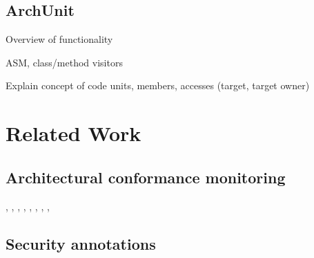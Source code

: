 \subsection{ArchUnit}\label{archunit-back-section}

Overview of functionality

ASM, class/method visitors

Explain concept of code units, members, accesses (target, target owner)

\section{Related Work}

\subsection{Architectural conformance monitoring}
\cite{aldrich_archjava_2002}, \cite{abi-antoun_analyzing_2010}, \cite{luckham_event-based_1995}, \cite{abi-antoun_static_2009}, \cite{de_silva_controlling_2012}, \cite{knodel_comparison_2007}, \cite{jansen_documenting_2008}, \cite{hong_yan_discotect_2004}, 

\subsection{Security annotations}



